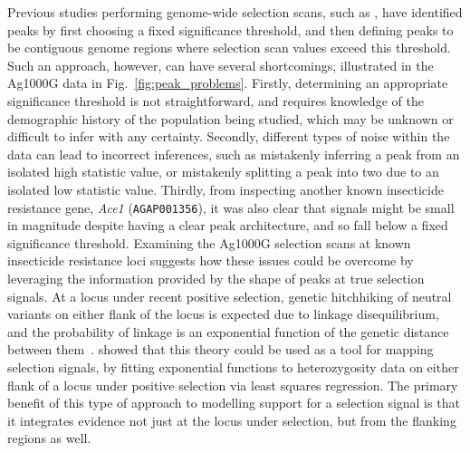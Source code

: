 \documentclass[a4paper,11pt,abstracton,hidelinks]{scrartcl}
\begin{document}
Previous studies performing genome-wide selection scans, such as \textcite{Garud2015}, have identified peaks by first choosing a fixed significance threshold, and then defining peaks to be contiguous genome regions where selection scan values exceed this threshold.
%
Such an approach, however, can have several shortcomings, illustrated in the Ag1000G data in Fig.~\ref{fig:peak_problems}.
%
Firstly, determining an appropriate significance threshold is not straightforward, and requires knowledge of the demographic history of the population being studied, which may be unknown or difficult to infer with any certainty.
%
Secondly, different types of noise within the data can lead to incorrect inferences, such as mistakenly inferring a peak from an isolated high statistic value, or mistakenly splitting a peak into two due to an isolated low statistic value.
%
Thirdly, from inspecting another known insecticide resistance gene, \textit{Ace1} (\texttt{AGAP001356}), it was also clear that signals might be small in magnitude despite having a clear peak architecture, and so fall below a fixed significance threshold.
%
Examining the Ag1000G selection scans at known insecticide resistance loci suggests how these issues could be overcome by leveraging the information provided by the shape of peaks at true selection signals.
%
At a locus under recent positive selection, genetic hitchhiking of neutral variants on either flank of the locus is expected due to linkage disequilibrium, and the probability of linkage is an exponential function of the genetic distance between them~\parencite{MaynardSmith1974}.
%
\textcite{Wiener2011} showed that this theory could be used as a tool for mapping selection signals, by fitting exponential functions to heterozygosity data on either flank of a locus under positive selection via least squares regression.
%
The primary benefit of this type of approach to modelling support for a selection signal is that it integrates evidence not just at the locus under selection, but from the flanking regions as well.
%
\end{document}
